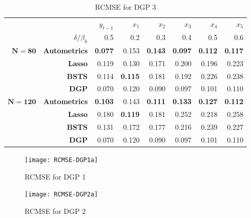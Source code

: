 \begin{table}[htbp]
  \centering

   \begin{tabular}{r|r|rrrrrr}

          &       & $y_{t-1}$ & $x_{1}$ & $x_{2}$ & $x_{3}$ & $x_{4}$ & $x_{5}$ \\
  & $\delta/\beta_{k}$ & 0.5   & 0.2   & 0.3   & 0.4   & 0.5   & 0.6 \\
   
          \hline
          \hline        
   $ \bm{N=80} $& \textbf{Autometrics} & \textbf{0.077} & 0.153 & \textbf{0.143} & \textbf{0.097} & \textbf{0.112 }& \textbf{0.117} \\
    \textbf{} & \textbf{Lasso} & 0.119 & 0.130 & 0.171 & 0.200 & 0.196 & 0.223 \\
    \textbf{} & \textbf{BSTS} & 0.114 & \textbf{0.115} & 0.181 & 0.192 & 0.226 & 0.238 \\
    \hline
    \textbf{} & \textbf{DGP} & 0.070 & 0.120 & 0.090 & 0.097 & 0.101 & 0.110 \\
    \hline
    \hline
    $\bm{N=120} $& \textbf{Autometrics} & \textbf{0.103} & 0.143 & \textbf{0.111} & \textbf{0.133} & \textbf{0.127} & \textbf{0.112 }\\
    \textbf{} & \textbf{Lasso} & 0.180 & \textbf{0.119} & 0.181 & 0.252 & 0.218 & 0.258 \\
    \textbf{} & \textbf{BSTS} & 0.131 & 0.172 & 0.177 & 0.216 & 0.239 & 0.227 \\
    \hline
    \textbf{} & \textbf{DGP} & 0.070 & 0.120 & 0.090 & 0.097 & 0.101 & 0.110 \\

    \end{tabular}%
      \caption{RCMSE for DGP 3}
  \label{fig:DGP3CMSE}%
\end{table}%

 








\begin{figure}[h]

\begin{minipage}{.5\textwidth}
\centering
\texttt{[image: RCMSE-DGP1a]}
\caption{RCMSE for DGP 1}
\label{RCMSECase1a}
\end{minipage}%
\begin{minipage}{.5\textwidth}
\centering
\texttt{[image: RCMSE-DGP2a]}
\caption{RCMSE for DGP 2}
\label{fig:RCMSECase2a}
\end{minipage}

\end{figure}



